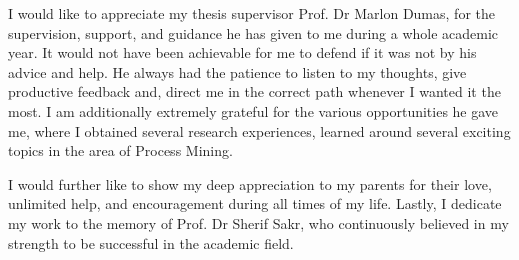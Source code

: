 

\begin{acknowledgements}      %

I would like to appreciate my thesis supervisor Prof. Dr Marlon Dumas, for the supervision, support, and guidance he has given to me during a whole academic year. It would not have been achievable for me to defend if it was not by his advice and help. He always had the patience to listen to my thoughts, give productive feedback and, direct me in the correct path whenever I wanted it the most. I am additionally extremely grateful for the various opportunities he gave me, where I obtained several research experiences, learned around several exciting topics in the area of Process Mining.  

I would further like to show my deep appreciation to my parents for their love, unlimited help, and encouragement during all times of my life. Lastly, I dedicate my work to the memory of Prof. Dr Sherif Sakr, who continuously believed in my strength to be successful in the academic field.



\end{acknowledgements}



